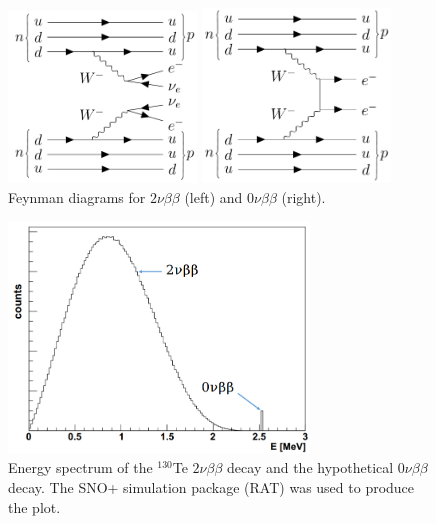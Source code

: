 \begin{figure}[htbp]
	\centering	
	\begin{minipage}[t]{0.45\textwidth}
		\includegraphics[width=5cm]{doubleBeta2nu_feynman.png}
	\end{minipage}
	\begin{minipage}[t]{0.45\textwidth}
		\includegraphics[width=5cm]{doubleBeta_feynman.png}
	\end{minipage}
	\caption{ Feynman diagrams for $2\nu\beta\beta$ (left) and $0\nu\beta\beta$ (right).}
	\label{feynman1}
\end{figure}

\begin{figure}[htbp]
	\centering	
	\includegraphics[width=8cm]{Te130_energy0vbb.png}
	\caption{Energy spectrum of the $^{130}$Te $2\nu\beta\beta$ decay and the hypothetical $0\nu\beta\beta$ decay. The SNO+ simulation package (RAT) was used to produce the plot.}
	\label{te130energy}
\end{figure}

